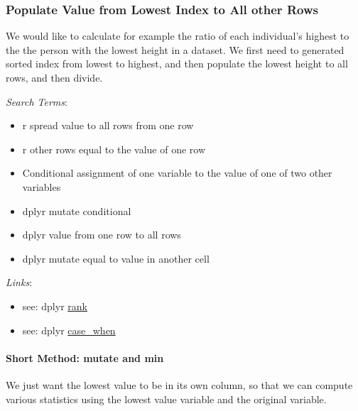 \documentclass[
]{book}
\providecommand{\tightlist}{%
  \setlength{\itemsep}{0pt}\setlength{\parskip}{0pt}}
\begin{document}
\hypertarget{populate-value-from-lowest-index-to-all-other-rows}{%
\subsubsection{Populate Value from Lowest Index to All other Rows}\label{populate-value-from-lowest-index-to-all-other-rows}}

We would like to calculate for example the ratio of each individual's highest to the the person with the lowest height in a dataset. We first need to generated sorted index from lowest to highest, and then populate the lowest height to all rows, and then divide.

\emph{Search Terms}:

\begin{itemize}
\tightlist
\item
  r spread value to all rows from one row
\item
  r other rows equal to the value of one row
\item
  Conditional assignment of one variable to the value of one of two other variables
\item
  dplyr mutate conditional
\item
  dplyr value from one row to all rows
\item
  dplyr mutate equal to value in another cell
\end{itemize}

\emph{Links}:

\begin{itemize}
\tightlist
\item
  see: dplyr \href{https://dplyr.tidyverse.org/reference/ranking.html}{rank}
\item
  see: dplyr \href{https://dplyr.tidyverse.org/reference/case_when.html}{case\_when}
\end{itemize}

\hypertarget{short-method-mutate-and-min}{%
\paragraph{Short Method: mutate and min}\label{short-method-mutate-and-min}}

We just want the lowest value to be in its own column, so that we can compute various statistics using the lowest value variable and the original variable.
\end{document}
